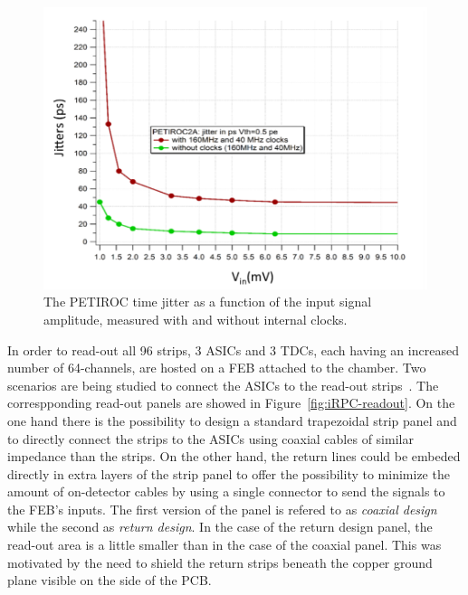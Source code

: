 	\begin{figure}[H]
		\centering
		\includegraphics[width=0.6\linewidth]{fig/chapt6/jitter-PETIROC.png}
		\caption{\label{fig:jitter} The PETIROC time jitter as a function of the input signal amplitude, measured with and without internal clocks.}
	\end{figure}
	
	In order to read-out all 96 strips, 3 ASICs and 3 TDCs, each having an increased number of 64-channels, are hosted on a FEB attached to the chamber. Two scenarios are being studied to connect the ASICs to the read-out strips~\cite{COMBARET2018}. The correspponding read-out panels are showed in Figure~\ref{fig:iRPC-readout}. On the one hand there is the possibility to design a standard trapezoidal strip panel and to directly connect the strips to the ASICs using coaxial cables of similar impedance than the strips. On the other hand, the return lines could be embeded directly in extra layers of the strip panel to offer the possibility to minimize the amount of on-detector cables by using a single connector to send the signals to the FEB's inputs. The first version of the panel is refered to as \textit{coaxial design} while the second as \textit{return design}. In the case of the return design panel, the read-out area is a little smaller than in the case of the coaxial panel. This was motivated by the need to shield the return strips beneath the copper ground plane visible on the side of the PCB.
	
